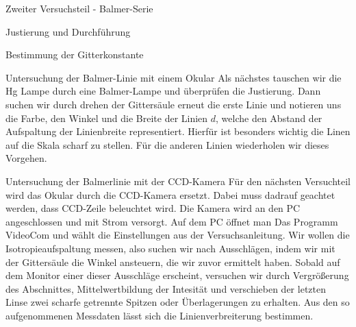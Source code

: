 \documentclass[pdftex, a4paper,11pt, twoside, ngerman]{report}
\begin{document}
\begin{chapter}{Zweiter Versuchsteil - Balmer-Serie}
\begin{section}{Justierung und Durchführung}
\begin{subsection}{Bestimmung der Gitterkonstante}

      \end{subsection}
      
      \begin{subsection}{Untersuchung der Balmer-Linie mit einem Okular}
        \label{chp:Balmer:sec:JusitierungDurchfuehrung:subsec:Okular}
        Als nächstes tauschen wir die Hg Lampe durch eine Balmer-Lampe und
        überprüfen die Justierung. Dann suchen wir durch drehen der Gittersäule 
        erneut die erste Linie und notieren uns die Farbe, den Winkel und die 
        Breite der Linien $d$, welche den Abstand der Aufspaltung der 
        Linienbreite representiert. Hierfür ist besonders wichtig die Linen 
        auf die Skala scharf zu stellen. Für die anderen Linien wiederholen 
        wir dieses Vorgehen.
          

      \end{subsection}
      
      \begin{subsection}{Untersuchung der Balmerlinie mit der CCD-Kamera}
        \label{chp:Balmer:sec:JusitierungDurchfuehrung:subsec:CCD}
        Für den nächsten Versuchteil wird das Okular durch die CCD-Kamera 
        ersetzt. Dabei muss dadrauf geachtet werden, dass CCD-Zeile beleuchtet 
        wird. Die Kamera wird an den PC angeschlossen und mit Strom versorgt. 
        Auf dem PC öffnet man Das Programm VideoCom und wählt die 
        Einstellungen aus der Versuchsanleitung. Wir wollen die 
        Isotropieaufspaltung messen, also suchen wir nach Ausschlägen, indem 
        wir mit der Gittersäule die Winkel ansteuern, die wir zuvor ermittelt 
        haben. Sobald auf dem Monitor einer dieser Ausschläge erscheint, 
        versuchen wir durch Vergrößerung des Abschnittes, Mittelwertbildung 
        der Intesität und verschieben der letzten Linse zwei scharfe getrennte 
        Spitzen oder Überlagerungen zu erhalten. Aus den so aufgenommenen 
        Messdaten lässt sich die Linienverbreiterung bestimmen.



\end{subsection}
\end{section}
\end{chapter}
\end{document}
